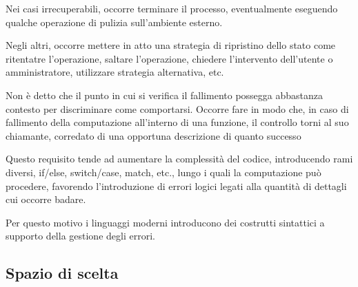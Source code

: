 

Nei casi irrecuperabili, occorre terminare il processo, eventualmente eseguendo
qualche operazione di pulizia sull'ambiente esterno.


Negli altri, occorre mettere in atto una strategia di ripristino dello stato
come ritentatre l'operazione, saltare l'operazione, chiedere l'intervento
dell'utente o amministratore, utilizzare strategia alternativa, etc.\newline



Non è detto che il punto in cui si verifica il fallimento possegga abbastanza
contesto per discriminare come comportarsi. Occorre fare in modo che, in caso di
fallimento della computazione all'interno di una funzione, il controllo torni al
suo chiamante, corredato di una opportuna descrizione di quanto successo





Questo requisito tende ad aumentare la complessità del codice, introducendo rami
diversi, if/else, switch/case, match, etc., lungo i quali la computazione può
procedere, favorendo l'introduzione di errori logici legati alla quantità di
dettagli cui occorre badare.

Per questo motivo i linguaggi moderni introducono dei costrutti sintattici
a supporto della gestione degli errori.


\subsection{Spazio di scelta}

